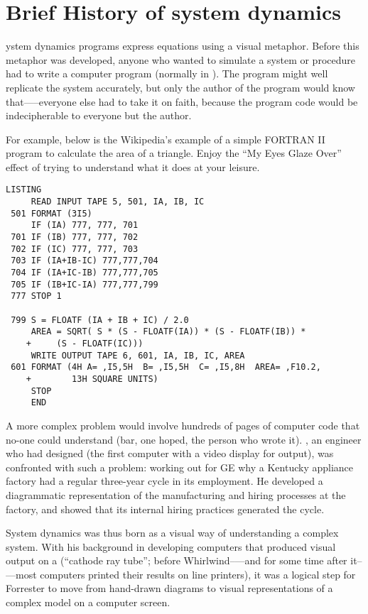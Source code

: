 \chapter{Brief History of system dynamics}

ystem dynamics programs express equations using a visual
metaphor. Before this metaphor was developed, anyone who wanted to
simulate a system or procedure had to write a computer program
(normally in
). The
program might well replicate the system accurately, but only the
author of the program would know that—--everyone else had to take it on
faith, because the program code would be indecipherable to everyone
but the author.



For example, below is the Wikipedia’s example of a simple FORTRAN II
program to calculate the area of a triangle. Enjoy the ``My Eyes Glaze
Over'' effect of trying to understand what it does at your leisure.

\begin{verbatim}
LISTING
     READ INPUT TAPE 5, 501, IA, IB, IC
 501 FORMAT (3I5)
     IF (IA) 777, 777, 701
 701 IF (IB) 777, 777, 702
 702 IF (IC) 777, 777, 703
 703 IF (IA+IB-IC) 777,777,704
 704 IF (IA+IC-IB) 777,777,705
 705 IF (IB+IC-IA) 777,777,799
 777 STOP 1

 799 S = FLOATF (IA + IB + IC) / 2.0
     AREA = SQRT( S * (S - FLOATF(IA)) * (S - FLOATF(IB)) *
    +     (S - FLOATF(IC)))
     WRITE OUTPUT TAPE 6, 601, IA, IB, IC, AREA
 601 FORMAT (4H A= ,I5,5H  B= ,I5,5H  C= ,I5,8H  AREA= ,F10.2,
    +        13H SQUARE UNITS)
     STOP
     END
\end{verbatim}

A more complex problem would involve hundreds of pages of computer
code that no-one could understand (bar, one hoped, the person who
wrote it). , an engineer
who had designed
(the
first computer with a video display for output), was confronted with
such a problem: working out for GE why a Kentucky appliance factory
had a regular three-year cycle in its employment. He developed a
diagrammatic representation of the manufacturing and hiring processes
at the factory, and showed that its internal hiring practices
generated the cycle.


System dynamics was thus born as a visual way of understanding a
complex system. With his background in developing computers that
produced visual output on a
(``cathode ray tube''; before Whirlwind--—and for some time after
it--—most computers printed their results on line printers), it was a
logical step for Forrester to move from hand-drawn diagrams to visual
representations of a complex model on a computer screen. 

